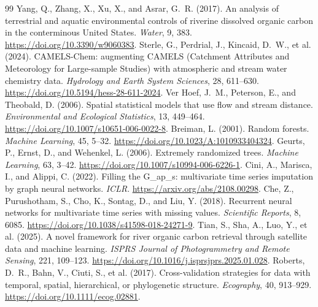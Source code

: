 \documentclass[11pt]{article}
\begin{document}
\begin{thebibliography}{99}
Yang, Q., Zhang, X., Xu, X., and Asrar, G.~R. (2017). An analysis of terrestrial and aquatic environmental controls of riverine dissolved organic carbon in the conterminous United States. \emph{Water}, 9, 383. \url{https://doi.org/10.3390/w9060383}.
Sterle, G., Perdrial, J., Kincaid, D.~W., et al. (2024). CAMELS-Chem: augmenting CAMELS (Catchment Attributes and Meteorology for Large-sample Studies) with atmospheric and stream water chemistry data. \emph{Hydrology and Earth System Sciences}, 28, 611--630. \url{https://doi.org/10.5194/hess-28-611-2024}.
Ver Hoef, J.~M., Peterson, E., and Theobald, D. (2006). Spatial statistical models that use flow and stream distance. \emph{Environmental and Ecological Statistics}, 13, 449--464. \url{https://doi.org/10.1007/s10651-006-0022-8}.
Breiman, L. (2001). Random forests. \emph{Machine Learning}, 45, 5--32. \url{https://doi.org/10.1023/A:1010933404324}.
Geurts, P., Ernst, D., and Wehenkel, L. (2006). Extremely randomized trees. \emph{Machine Learning}, 63, 3--42. \url{https://doi.org/10.1007/s10994-006-6226-1}.
Cini, A., Marisca, I., and Alippi, C. (2022). Filling the G\_ap\_s: multivariate time series imputation by graph neural networks. \emph{ICLR}. \url{https://arxiv.org/abs/2108.00298}.
Che, Z., Purushotham, S., Cho, K., Sontag, D., and Liu, Y. (2018). Recurrent neural networks for multivariate time series with missing values. \emph{Scientific Reports}, 8, 6085. \url{https://doi.org/10.1038/s41598-018-24271-9}.
Tian, S., Sha, A., Luo, Y., et al. (2025). A novel framework for river organic carbon retrieval through satellite data and machine learning. \emph{ISPRS Journal of Photogrammetry and Remote Sensing}, 221, 109--123. \url{https://doi.org/10.1016/j.isprsjprs.2025.01.028}.
Roberts, D.~R., Bahn, V., Ciuti, S., et al. (2017). Cross-validation strategies for data with temporal, spatial, hierarchical, or phylogenetic structure. \emph{Ecography}, 40, 913--929. \url{https://doi.org/10.1111/ecog.02881}.
\end{thebibliography}
\end{document}
